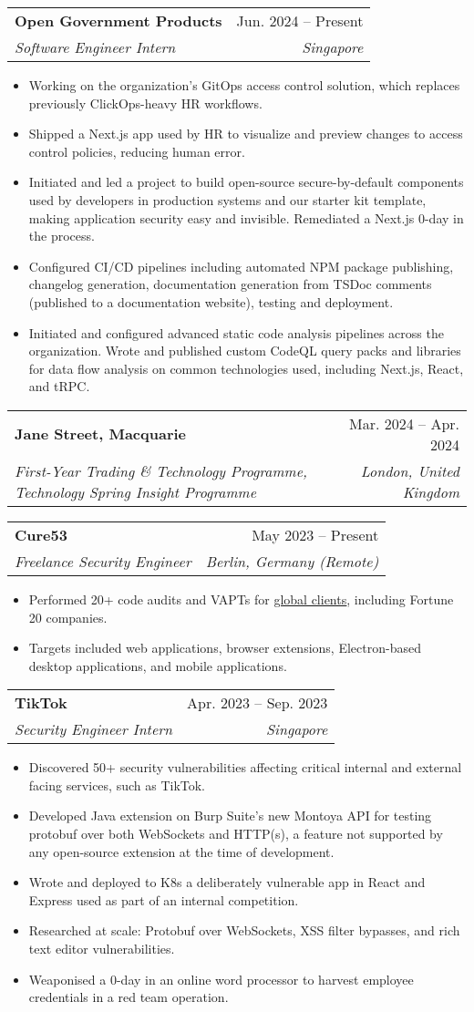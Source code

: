 \documentclass[letterpaper,10pt]{article}
\makeatletter
\newcommand{\link}[2]{\href{#1}{\color{blue}\underline{#2}}}
\newcommand{\resumeItem}[1]{
  \item\small{
    {#1 \vspace{-2pt}}
  }
}
\newcommand{\resumeSubheading}[4]{
  \vspace{-2pt}\item
  \begin{tabular*}{0.97\textwidth}[t]{l@{\extracolsep{\fill}}r}
    \textbf{#1} & #2 \\
    \textit{\small#3} & \textit{\small #4} \\
  \end{tabular*}\vspace{-7pt}
}
\newcommand{\resumeItemListStart}{\begin{itemize}}
\newcommand{\resumeItemListEnd}{\end{itemize}\vspace{-5pt}}
\makeatother
\begin{document}
\resumeSubheading {Open Government Products}{Jun.
	2024 -- Present}
{Software Engineer Intern}{Singapore}
\resumeItemListStart
\resumeItem{Working on the organization's GitOps access control solution, which replaces previously ClickOps-heavy HR workflows.}
\resumeItem{Shipped a Next.js app used by HR to visualize and preview changes to access control policies, reducing human error.}
\resumeItem{Initiated and led a project to build open-source secure-by-default components used by developers in production systems and our starter kit template, making application
	security easy and invisible.
	Remediated a Next.js 0-day in the process.
}
\resumeItem{Configured CI/CD pipelines including automated NPM package publishing, changelog generation, documentation generation from TSDoc comments (published to a documentation website), testing and deployment.}
\resumeItem{Initiated and configured advanced static code analysis pipelines across the organization.
	Wrote and published custom CodeQL query packs and libraries for data flow analysis on common technologies used, including Next.js, React, and tRPC.
}
\resumeItemListEnd
\vspace{2pt}

\resumeSubheading
{Jane Street, Macquarie}{Mar. 2024 -- Apr. 2024}
{First-Year Trading \& Technology Programme, Technology Spring Insight Programme}
{London, United Kingdom}
\vspace{2pt}

\resumeSubheading
{Cure53}{May 2023 -- Present}
{Freelance Security Engineer}{Berlin, Germany (Remote)}
\resumeItemListStart
\resumeItem{Performed 20+ code audits and VAPTs for \link{https://cure53.de/\#publications}{global clients}, including Fortune 20 companies.}
\resumeItem{Targets included web applications, browser extensions, Electron-based desktop applications, and mobile applications.}
\resumeItemListEnd
\vspace{2pt}

\resumeSubheading
{TikTok}{Apr. 2023 -- Sep. 2023}
{Security Engineer Intern}{Singapore}
\resumeItemListStart
\resumeItem{Discovered 50+ security vulnerabilities affecting critical internal and external facing services, such as TikTok.}
\resumeItem{Developed Java extension on Burp Suite's new Montoya API for testing protobuf over both WebSockets and HTTP(s), a feature not supported by any open-source extension at the time of development.}
\resumeItem{Wrote and deployed to K8s a deliberately vulnerable app in React and Express used as part of an internal competition.}
\resumeItem{Researched at scale: Protobuf over WebSockets, XSS filter bypasses, and rich text editor vulnerabilities.}
\resumeItem{Weaponised a 0-day in an online word processor to harvest employee credentials in a red team operation.}
\resumeItemListEnd
\end{document}
